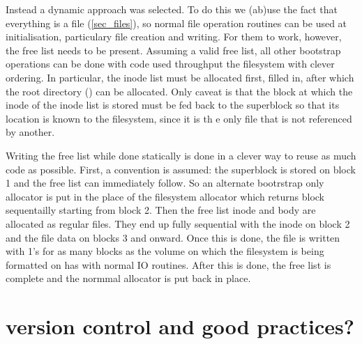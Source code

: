         Instead a dynamic approach was selected. To do this we (ab)use the fact
        that everything is a file (\ref{sec_files}), so normal file operation
        routines can be used at initialisation, particulary file creation and
        writing. For them to work, however, the free list needs to be present.
        Assuming a valid free list, all other bootstrap operations can be done
        with code used throughput the filesystem with clever ordering. In
        particular, the inode list must be allocated first, filled in, after
        which the root directory (\monospace{/}) can be allocated. Only caveat is
        that the block at which the inode of the inode list is stored must be
        fed back to the superblock so that its location is known to the
        filesystem, since it is th e only file that is not referenced by
        another.

        Writing the free list while done statically is done in a clever way to
        reuse as much code as possible. First, a convention is assumed: the
        superblock is stored on block 1 and the free list can immediately
        follow. So an alternate bootrstrap only allocator is put in the place
        of the filesystem allocator which returns block sequentailly starting
        from block 2. Then the free list inode and body are allocated as
        regular files. They end up fully sequential with the inode on block 2
        and the file data on blocks 3 and onward. Once this is done, the file
        is written with 1's for as many blocks as the volume on which the
        filesystem is being formatted on has with normal IO routines. After
        this is done, the free list is complete and the normmal allocator is
        put back in place.

    \section{version control and good practices?}
